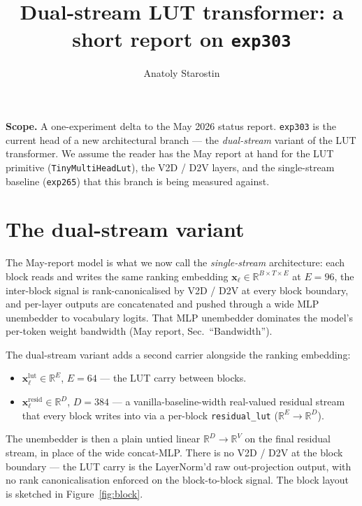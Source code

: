 \documentclass[11pt]{article}
\begin{document}
\title{\Large\textbf{Dual-stream LUT transformer: a short report on \texttt{exp303}}\vspace{-4pt}}
\author{Anatoly Starostin}
\date{}
\maketitle
\vspace{-18pt}

\noindent\textbf{Scope.}
A one-experiment delta to the May 2026 status report.
\texttt{exp303} is the current head of a new architectural branch --- the \emph{dual-stream} variant of the LUT transformer.
We assume the reader has the May report at hand for the LUT primitive (\texttt{TinyMultiHeadLut}), the V2D / D2V layers, and the single-stream baseline (\texttt{exp265}) that this branch is being measured against.

\section{The dual-stream variant}
\label{sec:arch}

The May-report model is what we now call the \emph{single-stream} architecture: each block reads and writes the same ranking embedding $\mathbf{x}_\ell \in \mathbb{R}^{B \times T \times E}$ at $E = 96$, the inter-block signal is rank-canonicalised by V2D / D2V at every block boundary, and per-layer outputs are concatenated and pushed through a wide MLP unembedder to vocabulary logits.
That MLP unembedder dominates the model's per-token weight bandwidth (May report, Sec.\ ``Bandwidth'').

The dual-stream variant adds a second carrier alongside the ranking embedding:
\begin{itemize}
\setlength{\itemsep}{1pt}
    \item $\mathbf{x}^{\text{lut}}_\ell \in \mathbb{R}^{E}$, $E = 64$ --- the LUT carry between blocks.
    \item $\mathbf{x}^{\text{resid}}_\ell \in \mathbb{R}^{D}$, $D = 384$ --- a vanilla-baseline-width real-valued residual stream that every block writes into via a per-block \texttt{residual\_lut} ($\mathbb{R}^E \to \mathbb{R}^D$).
\end{itemize}
The unembedder is then a plain untied linear $\mathbb{R}^D \to \mathbb{R}^V$ on the final residual stream, in place of the wide concat-MLP.
There is no V2D / D2V at the block boundary --- the LUT carry is the LayerNorm'd raw out-projection output, with no rank canonicalisation enforced on the block-to-block signal.
The block layout is sketched in Figure~\ref{fig:block}.
\end{document}
